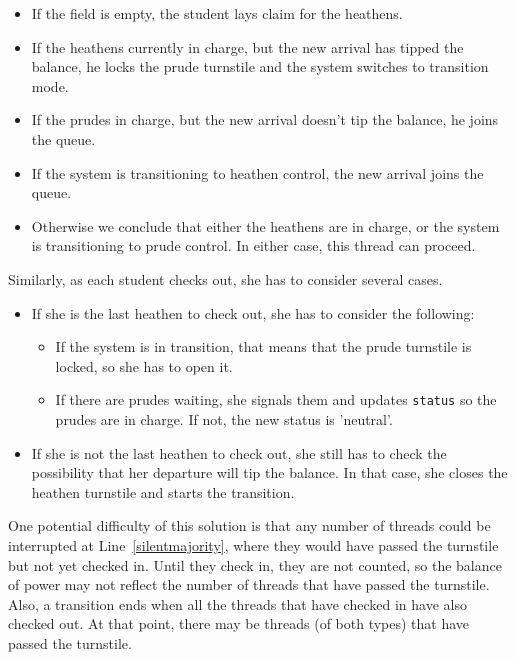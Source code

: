 \documentclass{book}
\begin{document}
\begin{itemize}

\item If the field is empty, the student lays claim for the heathens.

\item If the heathens currently in charge, but the new arrival
has tipped the balance, he locks the prude turnstile and the
system switches to transition mode.

\item If the prudes in charge, but the new arrival doesn't
tip the balance, he joins the queue.

\item If the system is transitioning to heathen control, the new arrival
joins the queue.

\item Otherwise we conclude that either the heathens are in charge, or the
system is transitioning to prude control.  In either case, this
thread can proceed.

\end{itemize}  

Similarly, as each student checks out, she has to consider several
cases.  

\begin{itemize}

\item If she is the last heathen to check out, she has to
consider the following:

    \begin{itemize}

    \item If the system is in transition, that means that the prude
      turnstile is locked, so she has to open it.

    \item If there are prudes waiting, she signals them and
      updates {\tt status} so the prudes are in charge.  If not, the
      new status is 'neutral'.

    \end{itemize}  

\item If she is not the last heathen to check out, she still has to
check the possibility that her departure will tip the balance.  In
that case, she closes the heathen turnstile and starts the
transition.

\end{itemize}

One potential difficulty of this solution is that any number
of threads could be interrupted at Line~\ref{silentmajority},
where they would have passed the turnstile but not yet checked in.
Until they check in, they are not counted, so the balance of
power may not reflect the number of threads that have passed the
turnstile.  Also, a transition ends when all the threads that have
checked in have also checked out.  At that point, there may
be threads (of both types) that have passed the turnstile.
\end{document}
